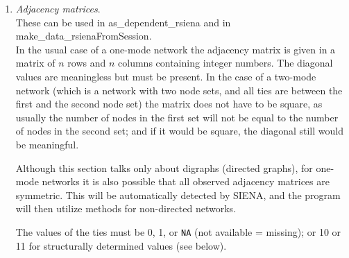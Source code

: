 \documentclass[a4paper,fleqn,11pt]{article}
\newcommand{\+}{\, + \,}
\newcommand{\sfn}[1]{\textsf{#1}}
\newcommand{\si}{{\sf SIENA}}
\begin{document}
\begin{enumerate}
\item \emph{Adjacency matrices}.\\
      These can be used in  \textsf{as\_dependent\_rsiena} and in
      \sfn{make\_data\_rsienaFromSession}.\\
      In the usual case of a one-mode network the adjacency matrix
      is given in a matrix of $n$ rows and $n$ columns
      containing integer numbers.
      The diagonal values are meaningless but must be present.
      In the case of a two-mode network (which is a network with two
      node sets, and all ties are between the first and the second node set)
      the matrix does not have to be
      square, as usually the number of nodes in the first set will not be
      equal to the number of nodes in the second set;
      and if it would be square, the diagonal still would be meaningful.

      Although this section talks only about digraphs (directed graphs),
      for one-mode networks it is
      also possible that all observed adjacency matrices are symmetric.
      This will be automatically detected by \si, and
      the program will then utilize methods for non-directed networks.

      The values of the ties must be 0, 1, or \texttt{NA}
      (not available = missing);
      or 10 or 11 for structurally determined values (see below).


\end{enumerate}
\end{document}
